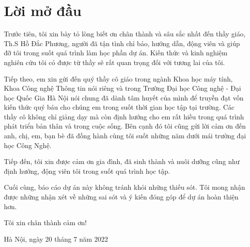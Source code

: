 \chapter*{Lời mở đầu}

Trước tiên, tôi xin bày tỏ lòng biết ơn chân thành và sâu sắc nhất đến thầy giáo, Th.S Hồ Đắc Phương, người đã tận tình chỉ bảo, hướng dẫn, động viên và giúp đỡ tôi trong suốt quá trình làm học phần dự án. Kiến thức và kinh nghiệm nghiên cứu tôi có được từ thầy sẽ rất quan trọng đối với tương lai của tôi.

Tiếp theo, em xin gửi đến quý thầy cô giáo trong ngành Khoa học máy tính, Khoa Công nghệ Thông tin nói riêng và trong Trường Đại học Công nghệ - Đại học Quốc Gia Hà Nội nói chung đã dành tâm huyết của mình để truyền đạt vốn kiến thức quý báu cho chúng em trong suốt thời gian học tập tại trường. Các thầy cô không chỉ giảng dạy mà còn định hướng cho em rất hiều trong quá trình phát triển bản thân và trong cuộc sống. Bên cạnh đó tôi cũng gửi lời cảm ơn đến anh, chị, em, bạn bè đã đồng hành cùng tôi suốt những năm dưới mái trường đại học Công Nghệ.

Tiếp đến, tôi xin được cảm ơn gia đình, đã sinh thành và nuôi dưỡng cũng như định hướng, động viên tôi trong suốt quá trình học tập.

Cuối cùng, báo cáo dự án này không tránh khỏi những thiếu sót. Tôi mong nhận được những nhận xét về những sai sót và ý kiến đóng góp để dự án hoàn thiện hơn.

Tôi xin chân thành cảm ơn!

\begin{flushright}
Hà Nội, ngày 20 tháng 7 năm 2022
\end{flushright}
